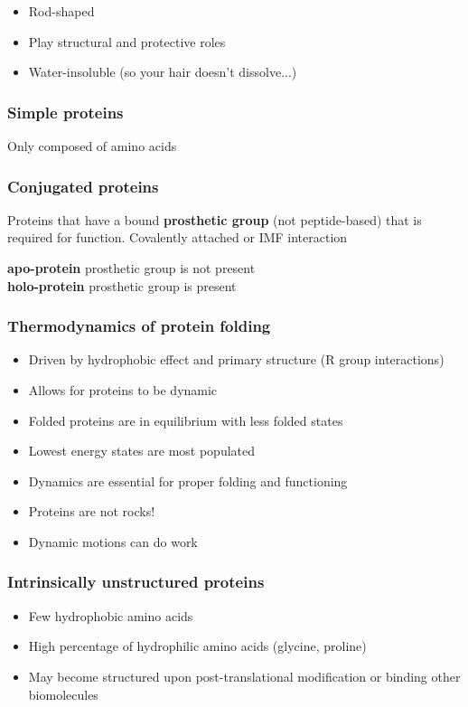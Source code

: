 \documentclass[letterpaper, 12pt]{article}
\begin{document}
\begin{itemize}
\item Rod-shaped
\item Play structural and protective roles
\item Water-insoluble (so your hair doesn't dissolve...)
\end{itemize}

\subsubsection*{Simple proteins}
Only composed of amino acids

\subsubsection*{Conjugated proteins}
Proteins that have a bound \textbf{prosthetic group} (not peptide-based) that is required for function. Covalently attached or IMF interaction

\textbf{apo-protein} prosthetic group is not present \\
\textbf{holo-protein} prosthetic group is present

\subsubsection*{Thermodynamics of protein folding}

\begin{itemize}
\item Driven by hydrophobic effect and primary structure (R group interactions)
\item Allows for proteins to be dynamic
\item Folded proteins are in equilibrium with less folded states
\item Lowest energy states are most populated
\item Dynamics are essential for proper folding and functioning
\item Proteins are not rocks!
\item Dynamic motions can do work
\end{itemize}

\subsubsection*{Intrinsically unstructured proteins}

\begin{itemize}
\item Few hydrophobic amino acids
\item High percentage of hydrophilic amino acids (glycine, proline)
\item May become structured upon post-translational modification or binding other biomolecules
\end{itemize}
\end{document}

